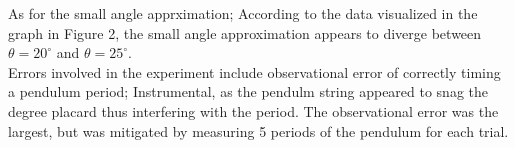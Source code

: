 \documentclass{article}
\begin{document}
As for the small angle apprximation; According to the data visualized in the graph in Figure 2, the 
small angle approximation appears to diverge between $\theta = 20^{\circ}$ and $\theta = 25^{\circ}$.\\

Errors involved in the experiment include observational error of correctly timing a pendulum period;
Instrumental, as the pendulm string appeared to snag the degree placard thus interfering with the period.
The observational error was the largest, but was mitigated by measuring 5 periods of the pendulum for
each trial.




% 
%
% 

\end{document}
